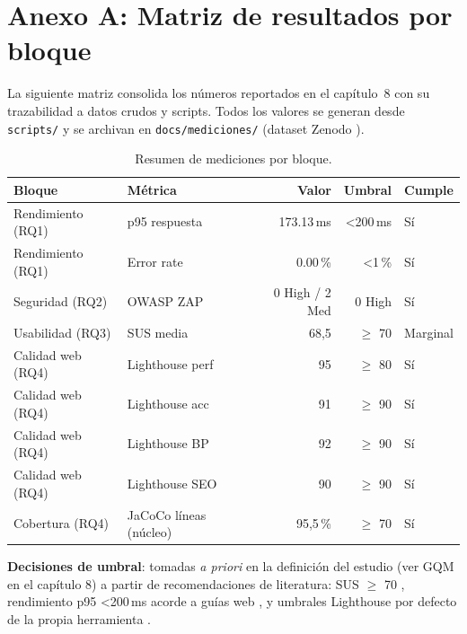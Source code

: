 \clearpage
\chapter*{Anexo A: Matriz de resultados por bloque}

La siguiente matriz consolida los números reportados en el capítulo~8 con su
trazabilidad a datos crudos y scripts. Todos los valores se generan desde
\texttt{scripts/} y se archivan en \texttt{docs/mediciones/} (dataset Zenodo
\cite{dataset_sgroas}).

\begin{table}[H]
\centering
\small
\caption{Resumen de mediciones por bloque.}
\begin{tabular}{@{}llrrl@{}}
\toprule
\textbf{Bloque} & \textbf{Métrica} & \textbf{Valor} & \textbf{Umbral} & \textbf{Cumple} \\
\midrule
Rendimiento (RQ1) & p95 respuesta & 173.13\,ms & \textless 200\,ms & Sí \\
Rendimiento (RQ1) & Error rate & 0.00\,\% & \textless 1\,\% & Sí \\
Seguridad (RQ2) & OWASP ZAP & 0 High / 2 Med & 0 High & Sí \\
Usabilidad (RQ3) & SUS media & 68,5 & $\geq$ 70 & Marginal \\
Calidad web (RQ4) & Lighthouse perf & 95 & $\geq$ 80 & Sí \\
Calidad web (RQ4) & Lighthouse acc & 91 & $\geq$ 90 & Sí \\
Calidad web (RQ4) & Lighthouse BP & 92 & $\geq$ 90 & Sí \\
Calidad web (RQ4) & Lighthouse SEO & 90 & $\geq$ 90 & Sí \\
Cobertura (RQ4) & JaCoCo líneas (núcleo) & 95,5\,\% & $\geq$ 70 & Sí \\
\bottomrule
\end{tabular}
\end{table}

\textbf{Decisiones de umbral}: tomadas \emph{a priori} en la definición del
estudio (ver GQM en el capítulo 8) a partir de recomendaciones de literatura:
SUS $\geq$ 70 \cite{bangor2009}, rendimiento p95 \textless 200\,ms acorde a
guías web \cite{foo2015}, y umbrales Lighthouse por defecto de la propia
herramienta \cite{lighthouse}.

